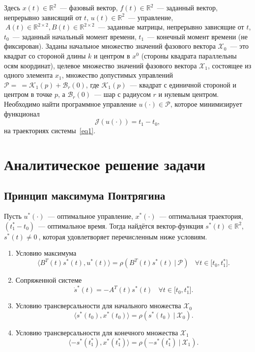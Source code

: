 \documentclass[a4paper,11pt]{article}
\begin{document}
Здесь $x(t) \in \mathbb{R}^2  $~--- фазовый вектор, $f(t) \in \mathbb{R}^2 $~--- заданный вектор, непрерывно зависящий от $t$, $u(t) \in \mathbb{R}^2 $~--- управление,$ \ A(t) \in \mathbb{R}^{2 \times 2}, B(t) \in \mathbb{R}^{2 \times 2}$~--- заданные матрицы, непрерывно зависящие от $t$, $t_0$~--- заданный начальный момент времени, $t_1$~--- конечный момент времени (не фиксирован). Заданы начальное множество значений фазового вектора $\mathcal{X}_0$~--- это квадрат со стороной длины $k$ и центром в $x^0$ (стороны квадрата параллельны осям координат), целевое множество значений фазового вектора $\mathcal{X}_1$, состоящее из одного элемента $x_1$, множество допустимых управлений $\mathcal{P} = \  = \mathcal{K}_1(p) + \mathcal{B}_r(0)$, где $\mathcal{K}_1(p)$~--- квадрат с единичной стороной и центром в точке $p$, а $\mathcal{B}_r(0) $~--- шар с радиусом $r$ и нулевым центром. Необходимо найти программное управление $u(\cdot) \in \mathcal{P}$, которое минимизирует функционал 
\[\mathcal{J}(u(\cdot)) = t_1 - t_0, \] на траекториях системы~\eqref{eq1}.
\section{Аналитическое решение задачи}
\subsection{Принцип максимума Понтрягина}
Пусть $u^{*}(\cdot)$~--- оптимальное управление, $x^{*}(\cdot)$~--- оптимальная траектория, $(t_{1}^{*} - t_0)$~--- оптимальное время. Тогда найдётся вектор-функция  $s^{*}(t) \in \mathbb{R}^2$, $s^{*}(t) \neq 0 \ $, которая удовлетворяет перечисленным ниже условиям.
\begin{enumerate}
\item Условию максимума
\begin{equation}\label{eq2}
\langle B^{T}(t) s^{*}(t), u^{*}(t) \rangle = \rho{(B^{T}(t)s^{*}(t) \ | \ \mathcal{P})} \ \ \ \  \forall t \in \texttt{[$t_0, t_1^*$]}. 
\end{equation}
\item Сопряженной системе
\begin{equation}\label{eq3}
\dot{s}^{*}(t) = -A^{T}(t)s^{*}(t) \ \ \ \  \forall t \in \texttt{[$t_0, t_1^*$]}.
\end{equation}
\item Условию трансверсальности для начального множества $\mathcal{X}_0$
\begin{equation}\label{eq4}
\langle s^{*}(t_0), x^{*}(t_0) \rangle = \rho{(s^{*}(t_0) \ | \  \mathcal{X}_0)}.
\end{equation}
\item Условию трансверсальности для конечного множества $\mathcal{X}_1$
\begin{equation}\label{eq5}
\langle -s^{*}(t_1^{*}), x^{*}(t_1^*) \rangle = \rho{(-s^{*}(t_1^{*}) \ | \  \mathcal{X}_1)}.
\end{equation}
\end{enumerate}
\end{document}
